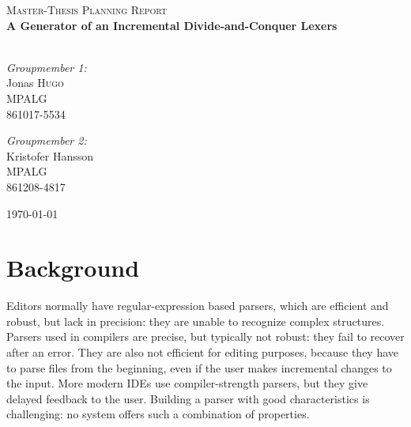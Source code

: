 \documentclass[11pt,a4paper]{article}
\begin{document}
\begin{titlepage}
\begin{center}


\textsc{\LARGE Master-Thesis Planning Report}\\[1.5cm]

\huge \bfseries  A Generator of an Incremental Divide-and-Conquer Lexers\\[0.4cm]

\textsc{\Large }\\[0.5cm]


\begin{minipage}{0.4\textwidth}
\begin{flushleft} \large
\emph{Groupmember 1:}\\
Jonas \textsc{Hugo}\\
MPALG\\
861017-5534
\end{flushleft}
\end{minipage}
\begin{minipage}{0.4\textwidth}
\begin{flushright} \large
\emph{Groupmember 2:} \\
Kristofer Hansson\\
MPALG\\
861208-4817
\end{flushright}
\end{minipage}
\vfill
{\large \today}
\end{center}
\end{titlepage}

\section{Background}
Editors normally have regular-expression based parsers, which are efficient and
robust, but lack in precision: they are unable to recognize complex structures.
Parsers used in compilers are precise, but typically not robust: they fail to
recover after an error. They are also not efficient for editing purposes,
because they have to parse files from the beginning, even if the user makes
incremental changes to the input. More modern IDEs use compiler-strength
parsers, but they give delayed feedback to the user. Building a parser with good
characteristics is challenging: no system offers such a combination of
properties.
\end{document}
